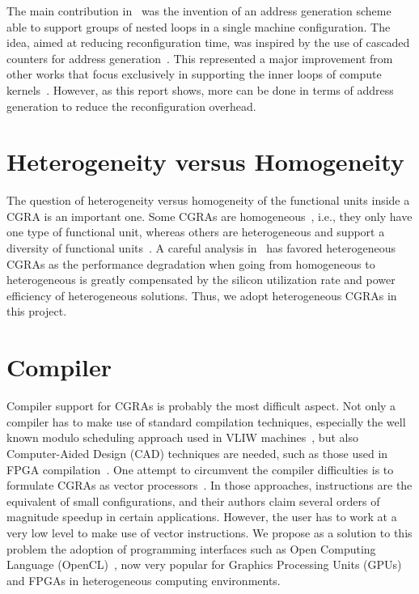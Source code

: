 The main contribution in~\cite{deSousa12} was the invention of an address
generation scheme able to support groups of nested loops in a single
machine configuration. The idea, aimed at reducing reconfiguration
time, was inspired by the use of cascaded counters for address
generation~\cite{Carta06}. This represented a major improvement from other
works that focus exclusively in supporting the inner loops of compute kernels~\cite{deSutter10}. However, as this report shows, more can be done
in terms of address generation to reduce the reconfiguration overhead.

\section{Heterogeneity versus Homogeneity}
\label{section:heterogeneityVsHomogeneity}

The question of heterogeneity versus homogeneity of the functional
units inside a CGRA is an important one. Some CGRAs are
homogeneous~\cite{Ebeling96}, i.e., they only have one type of functional unit,
whereas others are heterogeneous and support a diversity of functional
units~\cite{Heysters03}. A careful analysis in~\cite{Park12} has favored
heterogeneous CGRAs as the performance degradation when going from homogeneous
to heterogeneous is greatly compensated by the silicon utilization rate and
power efficiency of heterogeneous solutions. Thus, we adopt heterogeneous CGRAs
in this project.

\section{Compiler}
\label{section:compiler}

Compiler support for CGRAs is probably the most difficult aspect. Not
only a compiler has to make use of standard compilation techniques,
especially the well known modulo scheduling approach used in VLIW
machines~\cite{Rau94}, but also Computer-Aided Design (CAD) techniques
are needed, such as those used in FPGA compilation~\cite{Betz99}. One
attempt to circumvent the compiler difficulties is to formulate CGRAs as
vector processors~\cite{Severance13,Severance14,Naylor14}. In those approaches,
instructions are the equivalent of small configurations, and their
authors claim several orders of magnitude speedup in certain
applications. However, the user has to work at a very low level to
make use of vector instructions. We propose as a solution to this
problem the adoption of programming interfaces such as Open Computing Language
(OpenCL)~\cite{Stone10}, now very popular for Graphics Processing Units (GPUs)
and FPGAs in heterogeneous computing environments.

